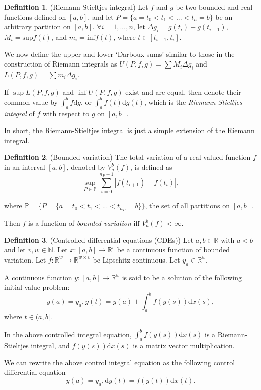 \documentclass[a4paper,11pt,titlepage]{article}
\theoremstyle{definition}
\newtheorem{definition}{Definition}[section]
\theoremstyle{plain}
\theoremstyle{remark}
\begin{document}
\begin{definition}
    (Riemann-Stieltjes integral) Let $f$ and $g$ be two bounded and real functions defined on $[a,b]$, and let $P=\{a=t_0<t_1<...<t_n=b\}$ be an arbitrary partition on $[a,b]$. $\forall i = 1,...,n$, let $\Delta g_i = g(t_i) - g(t_{i-1})$, $M_i=\mathrm{sup}f(t)$, and $m_i=\mathrm{inf}f(t)$, where $t\in[t_{i-1},t_i]$.
    
    We now define the upper and lower ‘Darboux sums’ similar to those in the construction of Riemann integrals as $U(P,f,g)=\sum M_i\Delta g_i$ and $L(P,f,g)=\sum m_i\Delta g_i$.

    If $\sup L(P,f,g)$ and $\inf U(P,f,g)$ exist and are equal, then denote their common value by $\int^b_af\mathrm{d}g$, or $\int^b_af(t)\mathrm{d}g(t)$, which is the \textit{Riemann-Stieltjes integral} of $f$ with respect to $g$ on $[a,b]$.
\end{definition}

In short, the Riemann-Stieltjes integral is just a simple extension of the Riemann integral.

\begin{definition}
    (Bounded variation) The total variation of a real-valued function $f$ in an interval $[a,b]$, denoted by $V_a^b(f)$, is defined as
$$\sup_{P\in\mathbb{P}}\sum_{i=0}^{n_P-1}\left|f(t_{i+1})-f(t_i)\right|,$$

where $\mathbb{P}=\{P=\{a=t_0<t_1<...<t_{n_P}=b\}\}$, the set of all partitions on $[a,b]$.

Then $f$ is a function of \textit{bounded variation} iff $V_a^b(f)<\infty$.
\end{definition}

\begin{definition}
    (Controlled differential equations (CDEs)) Let $a,b\in\mathbb{R}$ with $a<b$ and let $v,w\in\mathbb{N}$. Let $x:[a,b]\rightarrow\mathbb{R}^v$ be a continuous function of bounded variation. Let $f:\mathbb{R}^w\rightarrow\mathbb{R}^{w\times v}$ be Lipschitz continuous. Let $y_a\in\mathbb{R}^w$.

A continuous function $y:[a,b]\rightarrow\mathbb{R}^w$ is said to be a solution of the following initial value problem:
$$y(a)=y_a, y(t)=y(a)+\int_a^bf(y(s))\mathrm{d}x(s),$$
where $t\in(a,b].$ \cite{kidger2022neural}

In the above controlled integral equation, $\int_a^bf(y(s))\mathrm{d}x(s)$ is a Riemann-Stieltjes integral, and $f(y(s))\mathrm{d}x(s)$ is a matrix vector multiplication.

We can rewrite the above control integral equation as the following control differential equation
$$y(a)=y_a, \mathrm{d}y(t) = f(y(t))\mathrm{d}x(t).$$
\end{definition}
\end{document}

